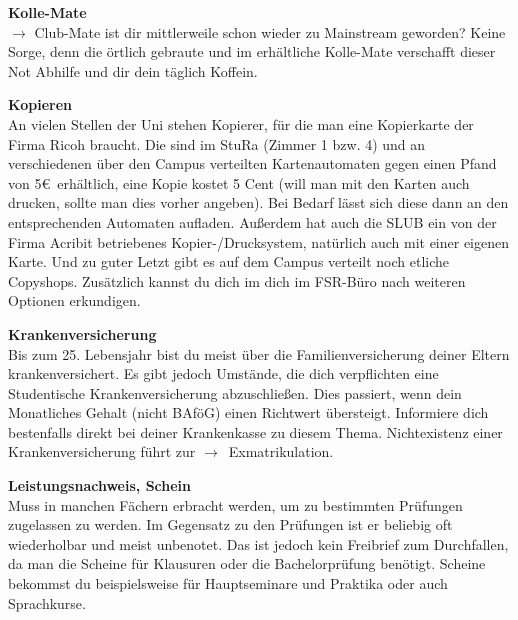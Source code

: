 \begin{multicols}{2}

\textbf{Kolle-Mate}\\
$\rightarrow$ Club-Mate ist dir mittlerweile schon wieder zu Mainstream geworden? Keine Sorge, denn die örtlich gebraute und im \ascii{} erhältliche Kolle-Mate verschafft dieser Not Abhilfe und dir dein täglich Koffein.

\textbf{Kopieren} \\
An vielen Stellen der Uni stehen Kopierer, für die man eine Kopierkarte der Firma Ricoh braucht. Die sind im StuRa (Zimmer 1 bzw. 4) und an verschiedenen über den Campus verteilten Kartenautomaten gegen einen Pfand von 5\euro\ erhältlich, eine Kopie kostet 5 Cent (will man mit den Karten auch drucken, sollte man dies vorher angeben).
Bei Bedarf lässt sich diese dann an den entsprechenden Automaten aufladen.
Außerdem hat auch die SLUB ein von der Firma Acribit betriebenes Kopier-/Drucksystem, natürlich auch mit einer eigenen Karte.
Und zu guter Letzt gibt es auf dem Campus verteilt noch etliche Copyshops.
Zusätzlich kannst du dich im dich im FSR-Büro nach weiteren Optionen erkundigen.

\textbf{Krankenversicherung} \\
Bis zum 25. Lebensjahr bist du meist über die Familienversicherung deiner Eltern krankenversichert.
Es gibt jedoch Umstände, die dich verpflichten eine Studentische Krankenversicherung abzuschließen.
Dies passiert, wenn dein Monatliches Gehalt (nicht BAföG) einen Richtwert übersteigt.
Informiere dich bestenfalls direkt bei deiner Krankenkasse zu diesem Thema.
Nichtexistenz einer Krankenversicherung führt zur \mbox{$\rightarrow$~Exmatrikulation}.



\textbf{Leistungsnachweis, Schein} \\
Muss in manchen Fächern erbracht werden, um zu bestimmten Prüfungen zugelassen zu werden.
Im Gegensatz zu den Prüfungen ist er beliebig oft wiederholbar und meist unbenotet.
Das ist jedoch kein Freibrief zum Durchfallen, da man die Scheine für Klausuren oder die Bachelorprüfung benötigt.
Scheine bekommst du beispielsweise für Hauptseminare und Praktika oder auch Sprachkurse.



\end{multicols}
